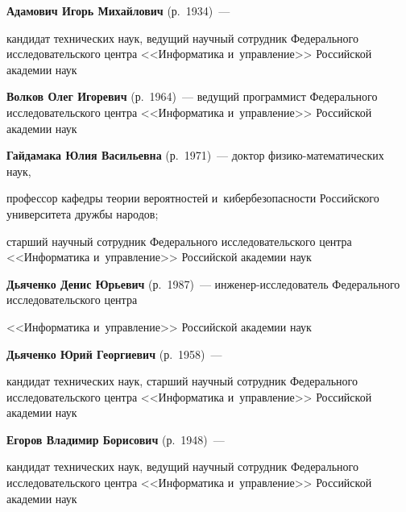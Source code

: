 \textbf{Адамович Игорь Михайлович} (р.\ 1934)~--- 


кандидат технических наук, ведущий научный со\-труд\-ник Федерального исследовательского цент\-ра <<Информатика и~управ\-ле\-ние>> Российской академии наук





\noindent


\textbf{Волков Олег Игоревич} (р.\ 1964)~--- ведущий программист Федерального исследовательского цент\-ра <<Информатика и~управ\-ле\-ние>> Российской академии наук





\noindent


\textbf{Гайдамака Юлия Васильевна} (р.\ 1971)~--- доктор фи\-зи\-ко-ма\-те\-ма\-ти\-че\-ских наук, 


профессор ка\-фед\-ры тео\-рии вероятностей и~ки\-бер\-безопас\-ности Российского университета дружбы народов; 


старший научный сотрудник Федерального исследовательского цент\-ра  <<Информатика и~управ\-ле\-ние>> Российской академии наук  





\noindent


\textbf{Дьяченко Денис Юрьевич} (р.\ 1987)~--- ин\-же\-нер-ис\-сле\-до\-ва\-тель Федерального исследовательского цент\-ра 


<<Информатика и~управ\-ле\-ние>> Российской академии наук





\noindent


\textbf{Дьяченко Юрий Георгиевич} (р.\ 1958)~--- 


кандидат технических наук, старший научный сотрудник Федерального исследовательского цент\-ра <<Информатика и~управ\-ле\-ние>> Российской академии наук





\noindent


\textbf{Егоров Владимир Борисович} (р.\ 1948)~--- 


кандидат технических наук, ведущий научный сотрудник Федерального исследовательского цент\-ра <<Информатика и~управ\-ле\-ние>> Российской академии наук





\noindent


